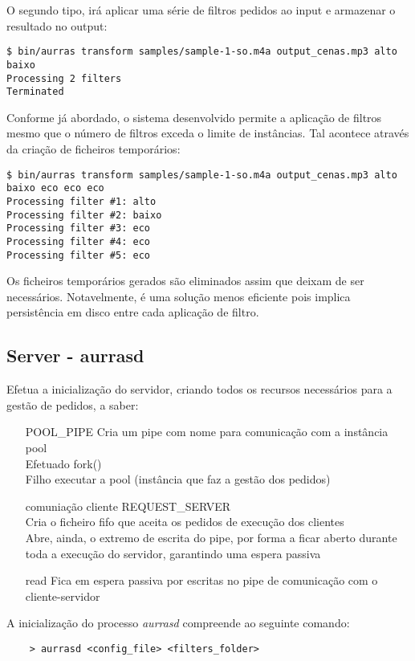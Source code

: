 \documentclass[11pt]{article}
\begin{document}
O segundo tipo, irá aplicar uma série de filtros pedidos ao input e armazenar o resultado no output:
\begin{verbatim}
$ bin/aurras transform samples/sample-1-so.m4a output_cenas.mp3 alto baixo
Processing 2 filters
Terminated
\end{verbatim}

Conforme já abordado, o sistema desenvolvido permite a aplicação de filtros mesmo que o número de filtros exceda o limite de instâncias. Tal acontece através
da criação de ficheiros temporários:
\begin{verbatim}
$ bin/aurras transform samples/sample-1-so.m4a output_cenas.mp3 alto baixo eco eco eco
Processing filter #1: alto
Processing filter #2: baixo
Processing filter #3: eco
Processing filter #4: eco
Processing filter #5: eco
\end{verbatim}

Os ficheiros temporários gerados são eliminados assim que deixam de ser necessários.
Notavelmente, é uma solução menos eficiente pois implica persistência em disco entre cada aplicação de filtro.

\subsection{Server - aurrasd} \label{aurrasd}

Efetua a inicialização do servidor, criando todos os recursos necessários para a gestão de pedidos, a saber:
\begin{itemize}
    \item[POOL\_PIPE] {Cria um pipe com nome para comunicação com a instância pool\\
          Efetuado fork()\\
          Filho executar a pool (instância que faz a gestão dos pedidos)}
    \item[comuniação cliente] {REQUEST\_SERVER\\
          Cria o ficheiro fifo que aceita os pedidos de execução dos clientes\\
          Abre, ainda, o extremo de escrita do pipe, por forma a ficar aberto durante toda a execução do servidor, garantindo uma espera passiva}
    \item[read] {Fica em espera passiva por escritas no pipe de comunicação com o cliente-servidor}
\end{itemize}

A inicialização do processo \textit{aurrasd} compreende ao seguinte comando:
\begin{verbatim}
    > aurrasd <config_file> <filters_folder>
\end{verbatim}
\end{document}
